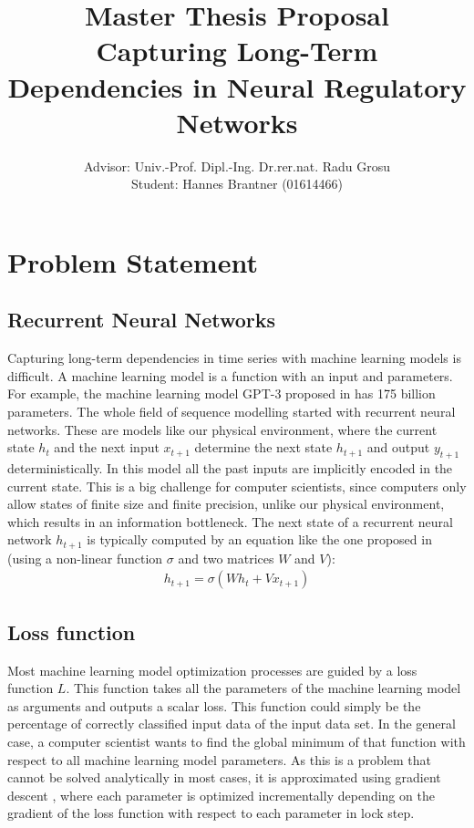 \documentclass{article}
\begin{document}
    \title{\textbf{Master Thesis Proposal}\\Capturing Long-Term Dependencies in Neural Regulatory Networks}
    \author{Advisor: Univ.-Prof. Dipl.-Ing. Dr.rer.nat. Radu Grosu\\Student: Hannes Brantner (01614466)}
    \maketitle{}


    \section{Problem Statement}

    \subsection{Recurrent Neural Networks}
    Capturing long-term dependencies in time series with machine learning models is difficult.
    A machine learning model is a function with an input and parameters.
    For example, the machine learning model GPT-3 proposed in \cite{GPT-3} has 175 billion parameters.
    The whole field of sequence modelling started with recurrent neural networks.
    These are models like our physical environment, where the current state $h_{t}$ and the next input $x_{t+1}$ determine the next state $h_{t+1}$ and output $y_{t+1}$ deterministically.
    In this model all the past inputs are implicitly encoded in the current state.
    This is a big challenge for computer scientists, since computers only allow states of finite size and finite precision, unlike our physical environment, which results in an information bottleneck.
    The next state of a recurrent neural network $h_{t+1}$ is typically computed by an equation like the one proposed in \cite{UnitaryRNNs} (using a non-linear function $\sigma$ and two matrices $W$ and $V$):
    \begin{align}
        \label{rnn_state_update}
        h_{t+1} = \sigma(Wh_t + Vx_{t+1})
    \end{align}

    \subsection{Loss function}
    Most machine learning model optimization processes are guided by a loss function $L$.
    This function takes all the parameters of the machine learning model as arguments and outputs a scalar loss.
    This function could simply be the percentage of correctly classified input data of the input data set.
    In the general case, a computer scientist wants to find the global minimum of that function with respect to all machine learning model parameters.
    As this is a problem that cannot be solved analytically in most cases, it is approximated using gradient descent \cite{GradientDescent}, where each parameter is optimized incrementally depending on the gradient of the loss function with respect to each parameter in lock step.
\end{document}

